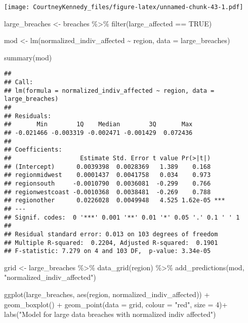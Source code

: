 \documentclass[
]{article}
\newenvironment{Shaded}{\begin{snugshade}}{\end{snugshade}}
\newcommand{\AttributeTok}[1]{\textcolor[rgb]{0.77,0.63,0.00}{#1}}
\newcommand{\ConstantTok}[1]{\textcolor[rgb]{0.00,0.00,0.00}{#1}}
\newcommand{\DecValTok}[1]{\textcolor[rgb]{0.00,0.00,0.81}{#1}}
\newcommand{\FunctionTok}[1]{\textcolor[rgb]{0.00,0.00,0.00}{#1}}
\newcommand{\NormalTok}[1]{#1}
\newcommand{\OtherTok}[1]{\textcolor[rgb]{0.56,0.35,0.01}{#1}}
\newcommand{\SpecialCharTok}[1]{\textcolor[rgb]{0.00,0.00,0.00}{#1}}
\newcommand{\StringTok}[1]{\textcolor[rgb]{0.31,0.60,0.02}{#1}}
\begin{document}
\texttt{[image: CourtneyKennedy\_files/figure-latex/unnamed-chunk-43-1.pdf]}

\begin{Shaded}
\begin{Highlighting}[]
\NormalTok{large\_breaches }\OtherTok{\textless{}{-}}\NormalTok{ breaches }\SpecialCharTok{\%\textgreater{}\%}
  \FunctionTok{filter}\NormalTok{(large\_affected }\SpecialCharTok{==} \ConstantTok{TRUE}\NormalTok{)}

\NormalTok{mod }\OtherTok{\textless{}{-}} \FunctionTok{lm}\NormalTok{(normalized\_indiv\_affected }\SpecialCharTok{\textasciitilde{}}\NormalTok{ region, }\AttributeTok{data =}\NormalTok{ large\_breaches)}

\FunctionTok{summary}\NormalTok{(mod)}
\end{Highlighting}
\end{Shaded}

\begin{verbatim}
## 
## Call:
## lm(formula = normalized_indiv_affected ~ region, data = large_breaches)
## 
## Residuals:
##       Min        1Q    Median        3Q       Max 
## -0.021466 -0.003319 -0.002471 -0.001429  0.072436 
## 
## Coefficients:
##                   Estimate Std. Error t value Pr(>|t|)    
## (Intercept)      0.0039398  0.0028369   1.389    0.168    
## regionmidwest    0.0001437  0.0041758   0.034    0.973    
## regionsouth     -0.0010790  0.0036081  -0.299    0.766    
## regionwestcoast -0.0010368  0.0038481  -0.269    0.788    
## regionother      0.0226028  0.0049948   4.525 1.62e-05 ***
## ---
## Signif. codes:  0 '***' 0.001 '**' 0.01 '*' 0.05 '.' 0.1 ' ' 1
## 
## Residual standard error: 0.013 on 103 degrees of freedom
## Multiple R-squared:  0.2204, Adjusted R-squared:  0.1901 
## F-statistic: 7.279 on 4 and 103 DF,  p-value: 3.34e-05
\end{verbatim}

\begin{Shaded}
\begin{Highlighting}[]
\NormalTok{grid }\OtherTok{\textless{}{-}}\NormalTok{ large\_breaches }\SpecialCharTok{\%\textgreater{}\%}
  \FunctionTok{data\_grid}\NormalTok{(region) }\SpecialCharTok{\%\textgreater{}\%}
  \FunctionTok{add\_predictions}\NormalTok{(mod, }\StringTok{"normalized\_indiv\_affected"}\NormalTok{)}

\FunctionTok{ggplot}\NormalTok{(large\_breaches, }\FunctionTok{aes}\NormalTok{(region, normalized\_indiv\_affected)) }\SpecialCharTok{+}
  \FunctionTok{geom\_boxplot}\NormalTok{() }\SpecialCharTok{+}
  \FunctionTok{geom\_point}\NormalTok{(}\AttributeTok{data =}\NormalTok{ grid, }\AttributeTok{colour =} \StringTok{"red"}\NormalTok{, }\AttributeTok{size =} \DecValTok{4}\NormalTok{)}\SpecialCharTok{+}
  \FunctionTok{labs}\NormalTok{(}\StringTok{"Model for large data breaches with normalized indiv affected"}\NormalTok{)}
\end{Highlighting}
\end{Shaded}
\end{document}
